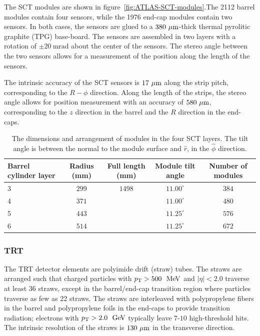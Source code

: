 The SCT modules are shown in figure~\ref{fig:ATLAS-SCT-modules}.The 2112 barrel modules contain four sensors, while the 1976 end-cap modules contain two sensors. In both cases, the sensors are glued to a $380~\mu\mathrm{m}$-thick thermal pyrolitic graphite (TPG) base-board. The sensors are assembled in two layers with a rotation of $\pm 20~\mbox{mrad}$ about the center of the sensors. The stereo angle between the two sensors allows for a measurement of the position along the length of the sensors. 


The intrinsic accuracy of the SCT sensors is $17~\mu\mathrm{m}$ along the strip pitch, corresponding to the $R-\phi$ direction. Along the length of the strips, the stereo angle allows for position measurement with an accuracy of $580~\mu\mathrm{m}$, corresponding to the $z$ direction in the barrel and the $R$ direction in the end-caps.

\begin{table}[htbp]
	\centering
	\begin{tabular}{|l|c|c|c|c|}
		\hline
		\textbf{Barrel cylinder layer} & \textbf{Radius (mm)} & \textbf{Full length (mm)} & \textbf{Module tilt angle} & \textbf{Number of modules} \\
		\hline
		3 & $299$ & $1498$ & $11.00^{\circ}$ & $384$ \\
		4 & $371$ & & $11.00^{\circ}$ & $480$ \\
		5 & $443$ & & $11.25^{\circ}$ & $576$ \\
		6 & $514$ & & $11.25^{\circ}$ & $672$ \\
		\hline
	\end{tabular}
	\caption{The dimensions and arrangement of modules in the four SCT layers. The tilt angle is between the normal to the module surface and $\hat{r}$, in the $\hat{\phi}$ direction.}
	\label{fig:ATLAS-SCT-layout}
\end{table}

\subsubsection{TRT}\label{sec:ATLAS-id-trt}

The TRT detector elements are polyimide drift (straw) tubes. The straws are arranged such that charged particles with $\pt > 500~\MeV$ and $|\eta|<2.0$ traverse at least 36 straws, except in the barrel/end-cap transition region where particles traverse as few as 22 straws. The straws are interleaved with polypropylene fibers in the barrel and polypropylene foils in the end-caps to provide transition radiation; electrons with $\pt>2.0~\GeV$ typically leave $7$-$10$ high-threshold hits. The intrinsic resolution of the straws is $130~\mu\mathrm{m}$ in the transverse direction.

